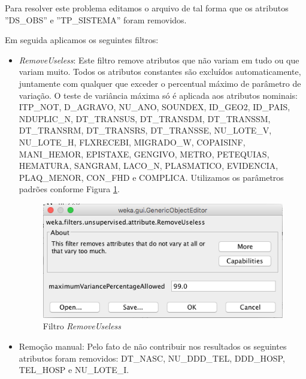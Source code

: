 \documentclass[
	12pt,				%
	openright,			%
	oneside,	
	a4paper,				%
	english,				%
	brazil				%
]{abntex2/abntex2} %
\begin{document}
		Para resolver este problema editamos o arquivo de tal forma que os atributos ''DS\_OBS'' e ''TP\_SISTEMA'' foram removidos. 
		
		Em seguida aplicamos os seguintes filtros:
		
		\begin{itemize}
			\item \textit{RemoveUseless}: Este filtro remove atributos que não variam em tudo ou que variam muito. Todos os atributos constantes são excluídos automaticamente, juntamente com qualquer que exceder o percentual máximo de parâmetro de variação. O teste de variância máxima só é aplicada aos atributos nominais: ITP\_NOT, D\_AGRAVO, NU\_ANO, SOUNDEX, ID\_GEO2, ID\_PAIS, NDUPLIC\_N, DT\_TRANSUS, DT\_TRANSDM, DT\_TRANSSM, DT\_TRANSRM, DT\_TRANSRS, DT\_TRANSSE, NU\_LOTE\_V, NU\_LOTE\_H, FLXRECEBI, MIGRADO\_W, COPAISINF, MANI\_HEMOR, EPISTAXE, GENGIVO, METRO, PETEQUIAS, HEMATURA, SANGRAM, LACO\_N, PLASMATICO, EVIDENCIA, PLAQ\_MENOR, CON\_FHD e  COMPLICA. Utilizamos os parâmetros padrões conforme Figura \ref{figfiltroRemoveUseless}.
			\begin{figure}[!h]
				\caption{\label{figfiltroRemoveUseless} Filtro \textit{RemoveUseless}}
				\begin{center}
					\includegraphics[scale=0.45]{img/filtroRemoveUseless.png}
				\end{center}
			\end{figure}
			
			\item Remoção manual: Pelo fato de não contribuir nos resultados os seguintes atributos foram removidos: DT\_NASC, NU\_DDD\_TEL, DDD\_HOSP, TEL\_HOSP e NU\_LOTE\_I.
			

\end{itemize}
\end{document}
